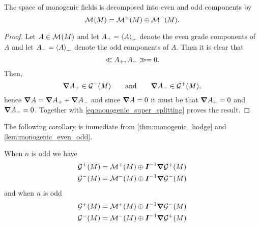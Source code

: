 \begin{lemma}
\label{lem:monogenic_even_odd}
The space of monogenic fields is decomposed into even and odd components by
\begin{equation}
    \monogenicfields{} = \monogenicfields{+} \oplus \monogenicfields{-}.
\end{equation}
\end{lemma}
\begin{proof}
Let $A \in \monogenicfields{}$ and let $A_+=\proj{+}{A}$ denote the even grade components of $A$ and let $A_-=\proj{-}{A}$ denote the odd components of $A$. Then it is clear that 
\begin{equation}
\label{eq:monogenic_super_splitting}
\multivecinnerproduct{A_+}{A_-} = 0.
\end{equation}
Then,
\begin{equation}
\grad A_+ \in \G^-(M) \qquad \textrm{and} \qquad \grad A_- \in \G^+(M),
\end{equation}
hence $\grad A = \grad A_+ + \grad A_-$ and since $\grad A=0$ it must be that $\grad A_+=0$ and $\grad A_-=0$. Together with \cref{eq:monogenic_super_splitting} proves the result.
\end{proof}

The following corollary is immediate from \cref{thm:monogenic_hodge} and \cref{lem:monogenic_even_odd}.
\begin{corollary}
When $n$ is odd we have
\begin{align}
\G^+(M) &= \monogenicfields{+} \oplus \pseudoscalar^{-1} \grad \G^+(M)\\
\G^-(M) &= \monogenicfields{-} \oplus \pseudoscalar^{-1} \grad \G^-(M)\\
\end{align}
and when $n$ is odd
\begin{align}
\G^+(M) &= \monogenicfields{+} \oplus \pseudoscalar^{-1} \grad \G^-(M)\\
\G^-(M) &= \monogenicfields{-} \oplus \pseudoscalar^{-1} \grad \G^+(M)\\
\end{align}
\end{corollary}



